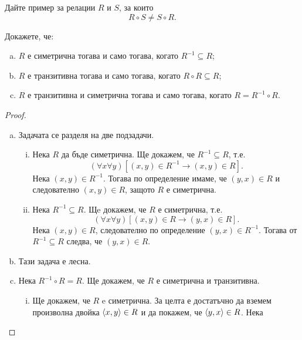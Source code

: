 \begin{problem}
  Дайте пример за релации $R$ и $S$, за които
  \[R\circ S \neq S\circ R.\]
\end{problem}

  
\begin{problem}
  Докажете, че:
  \begin{enumerate}[a)]
  \item
    $R$ е симетрична тогава и само тогава, когато $R^{-1}\subseteq R$;
  \item
    $R$ е транзитивна тогава и само тогава, когато $R\circ R\subseteq R$;
  \item
    $R$ е транзитивна и симетрична тогава и само тогава, когато $R = R^{-1}\circ R$.
\end{enumerate}
\end{problem}
\begin{proof}
  \begin{enumerate}[a)]
  \item
    Задачата се разделя на две подзадачи.
    \begin{enumerate}[(i)]
    \item
      Нека $R$ да бъде симетрична. Ще докажем, че $R^{-1}\subseteq R$, т.е.
      \[(\forall x\forall y)[(x,y)\in R^{-1} \rightarrow (x,y)\in R].\]
      Нека $(x,y)\in R^{-1}$. Тогава по определение имаме, че $(y,x)\in R$ и следователно $(x,y)\in R$,
      защото $R$ е симетрична.
    \item
      Нека $R^{-1}\subseteq R$. Щe докажем, че $R$ е симетрична, т.е.
      \[(\forall x\forall y)[(x,y)\in R \rightarrow (y,x)\in R].\]
      Нека $(x,y)\in R$, следователно по определение $(y,x)\in R^{-1}$.
      Тогава от $R^{-1}\subseteq R$ следва, че $(y,x)\in R$.
    \end{enumerate}
  \item
    Тази задача е лесна.
  \item
    Нека $R^{-1}\circ R = R$. Ще докажем, че $R$
    е симетрична и транзитивна.
    \begin{enumerate}[(i)]
    \item
      Ще докажем, че $R$ e симетрична.
      За целта е достатъчно да вземем произволна двойка $\langle{x,y}\rangle \in R$
      и да покажем, че $\langle{y,x}\rangle \in R$.
      Нека 

\end{enumerate}
\end{enumerate}
\end{proof}
